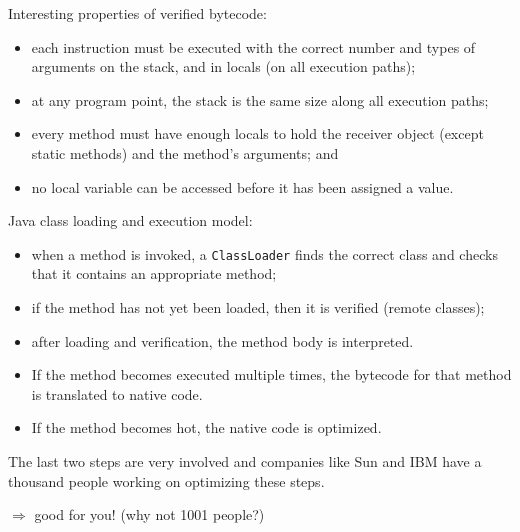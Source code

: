 \begin{slide*}
Interesting properties of verified bytecode:
 
\begin{itemize}
\item each instruction must be executed
with the correct number and types of arguments
on the stack, and in locals (on all execution
paths);
\item at any program point, the stack is
the same size along all execution paths;
\item every method must have enough locals to hold
the receiver object (except static methods) and the method's arguments; and
\item
no local variable can be accessed before it
has been assigned a value.
\end{itemize}
\vfil
\end{slide*}

\begin{slide*}
Java class loading and execution model:
\begin{itemize}
\item when a method is invoked,  a {\tt ClassLoader}
finds the correct class and checks that it contains an
appropriate method;
\item if the method has not yet been
loaded, then it is verified (remote classes); 
\item
after loading and verification, the method body is interpreted.
\item If the method becomes executed multiple times, the bytecode for that
method is translated to native code.
\item If the method becomes hot, the native code is optimized.
\end{itemize}
The last two steps are very involved and companies like Sun and IBM have
a thousand people working on optimizing these steps.

\hfill $\Rightarrow$ good for you! (why not 1001 people?)
\vfil
\end{slide*}

